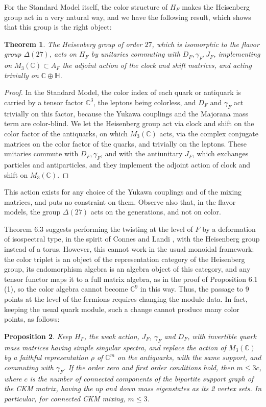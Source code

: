 \documentclass[11pt]{amsart}
\newtheorem{theorem}{Theorem}[section]
\newtheorem{proposition}[theorem]{Proposition}
\theoremstyle{definition}
\begin{document}
For the Standard Model itself, the color structure of $H_F$ makes the Heisenberg group act in a very natural way, and we have the following result, which shows that this group is the right object:

\begin{theorem}
The Heisenberg group of order $27$, which is isomorphic to the flavor group $\Delta(27)$, acts on $H_F$ by unitaries commuting with $D_F,\gamma_F,J_F$, implementing on $M_3(\mathbb C)\subset A_F$ the adjoint action of the clock and shift matrices, and acting trivially on $\mathbb C\oplus\mathbb H$.
\end{theorem}

\begin{proof}
In the Standard Model, the color index of each quark or antiquark is carried by a tensor factor $\mathbb C^3$, the leptons being colorless, and $D_F$ and $\gamma_F$ act trivially on this factor, because the Yukawa couplings and the Majorana mass term are color-blind. We let the Heisenberg group act via clock and shift on the color factor of the antiquarks, on which $M_3(\mathbb C)$ acts, via the complex conjugate matrices on the color factor of the quarks, and trivially on the leptons. These unitaries commute with $D_F,\gamma_F$, and with the antiunitary $J_F$, which exchanges particles and antiparticles, and they implement the adjoint action of clock and shift on $M_3(\mathbb C)$.
\end{proof}

This action exists for any choice of the Yukawa couplings and of the mixing matrices, and puts no constraint on them. Observe also that, in the flavor models, the group $\Delta(27)$ acts on the generations, and not on color.

Theorem 6.3 suggests performing the twisting at the level of $F$ by a deformation of isospectral type, in the spirit of Connes and Landi \cite{cla}, with the Heisenberg group instead of a torus. However, this cannot work in the usual monoidal framework: the color triplet is an object of the representation category of the Heisenberg group, its endomorphism algebra is an algebra object of this category, and any tensor functor maps it to a full matrix algebra, as in the proof of Proposition 6.1 (1), so the color algebra cannot become $\mathbb C^9$ in this way. Thus, the passage to 9 points at the level of the fermions requires changing the module data. In fact, keeping the usual quark module, such a change cannot produce many color points, as follows:

\begin{proposition}
Keep $H_F$, the weak action, $J_F$, $\gamma_F$ and $D_F$, with invertible quark mass matrices having simple singular spectra, and replace the action of $M_3(\mathbb C)$ by a faithful representation $\rho$ of $\mathbb C^m$ on the antiquarks, with the same support, and commuting with $\gamma_F$. If the order zero and first order conditions hold, then $m\leq3c$, where $c$ is the number of connected components of the bipartite support graph of the CKM matrix, having the up and down mass eigenstates as its 2 vertex sets. In particular, for connected CKM mixing, $m\leq3$.
\end{proposition}
\end{document}
